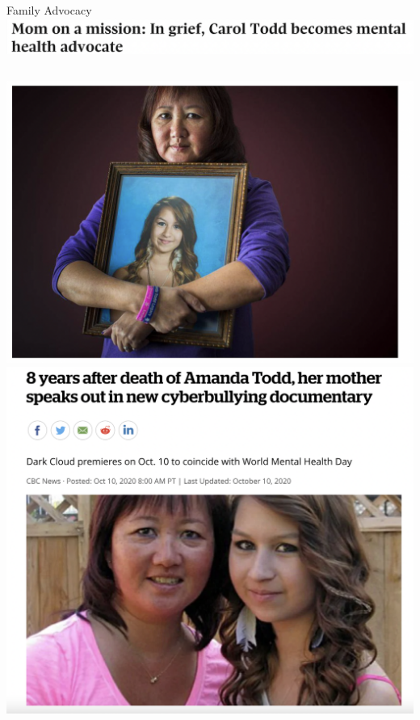 \documentclass[nobackground,dvipsnames,table,aspectratio=169]{beamer}
\begin{document}
\begin{frame}{Family Advocacy}
    \includegraphics[width=\textwidth]{carol-todd-headline}
    \begin{columns}
            \includegraphics[width=\textwidth]{carol-todd-1}
            \includegraphics[width=\textwidth]{carol-todd-2}
    \end{columns}
\end{frame}
\end{document}

